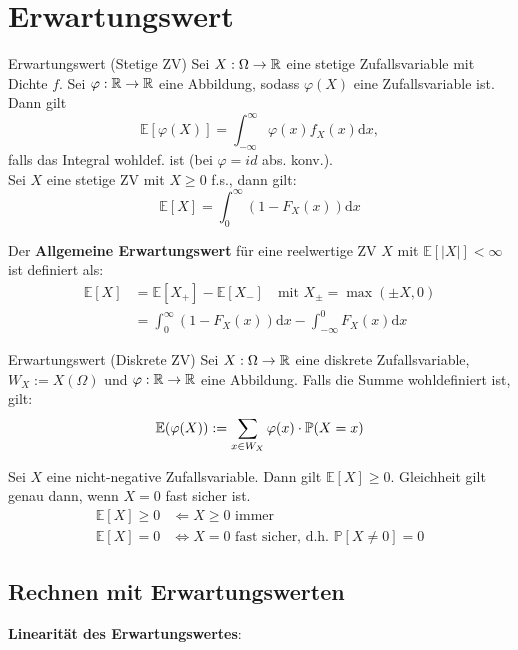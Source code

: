 \section{Erwartungswert}
\begin{mainbox}{Erwartungswert (Stetige ZV)}
    Sei $X: \Omega \to \R$ eine stetige Zufallsvariable mit Dichte $f$. Sei $\varphi: \R \to \R$ eine Abbildung, sodass $\varphi(X)$ eine Zufallsvariable ist. Dann gilt
    $$\mathbb{E}[\varphi(X)]=\int_{-\infty}^{\infty} \varphi(x) f_{X}(x) \mathrm{d} x,$$
	falls das Integral wohldef. ist (bei $\varphi\!=\!id$ abs. konv.).\\
    Sei $X$ eine stetige ZV mit $X \geq 0$ f.s., dann gilt:
    $$\mathbb{E}[X]=\int_0^{\infty}\left(1-F_X(x)\right) \mathrm{d} x$$ 
    
    Der \textbf{Allgemeine Erwartungswert} für eine reelwertige ZV $X$ mit $\mathbb{E}[|X|]<\infty$ ist definiert als:
    $$
    \begin{aligned}
    	\mathbb{E}[X]&=\mathbb{E}\left[X_{+}\right]-\mathbb{E}\left[X_{-}\right]
    	\quad \text{mit }X_{\pm}\!=\!\max (\pm X, 0)\\
    &=\textstyle \int_0^{\infty}\left(1-F_X(x)\right) \mathrm{d} x-\int_{-\infty}^0 F_X(x) \mathrm{d} x
    \end{aligned}
    $$
\end{mainbox}

\begin{mainbox}{Erwartungswert (Diskrete ZV)}
    Sei $X: \Omega \to \R$ eine diskrete Zufallsvariable, $W_X := X(\Omega)$ und $\varphi: \R \to \R$ eine Abbildung. Falls die Summe wohldefiniert ist, gilt: 
    $$\mathbb{E}(\varphi(X)) := \sum_{x \in W_X} \varphi(x) \cdot \P(X = x)$$
\end{mainbox}

Sei $X$ eine nicht-negative Zufallsvariable. Dann gilt $\mathbb{E}[X] \geq 0$. Gleichheit gilt genau dann, wenn $X=0$ fast sicher ist.
$$
\begin{aligned}
\mathbb{E}[X] \geq 0 &\Longleftarrow X \geq 0 \text{ immer}\\
\mathbb{E}[X] = 0 &\iff X = 0 \text{ fast sicher, d.h. } \mathbb{P}[X \neq 0] = 0
\end{aligned}
$$


\subsection{Rechnen mit Erwartungswerten}
\textbf{Linearität des Erwartungswertes}: 

